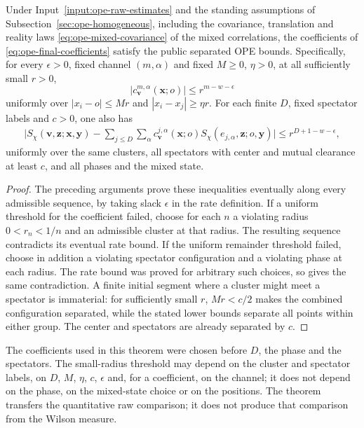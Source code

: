 \begin{theorem}\label{thm:ope-quantitative}
Under Input~\ref{input:ope-raw-estimates} and the standing assumptions of
Subsection~\ref{sec:ope-homogeneous}, including the covariance, translation and
reality laws \eqref{eq:ope-mixed-covariance} of the mixed correlations,
the coefficients of
\eqref{eq:ope-final-coefficients} satisfy the public separated OPE bounds.
Specifically, for every $\epsilon>0$, fixed channel $(m,\alpha)$ and
fixed $M\geq0$, $\eta>0$, at all sufficiently small $r>0$,
\[
 |c_{\boldsymbol v}^{m,\alpha}(\boldsymbol x;o)|
                      \leq r^{m-w-\epsilon}
\]
uniformly over $|x_i-o|\leq Mr$ and $|x_i-x_j|\geq\eta r$.
For each finite $D$, fixed spectator labels and $c>0$, one also has
\begin{align*}
 \bigg|S_\chi(\boldsymbol v,\boldsymbol z;\boldsymbol x,\boldsymbol y)
  -\sum_{j\leq D}\sum_\alpha
   c_{\boldsymbol v}^{j,\alpha}(\boldsymbol x;o)
   S_\chi(e_{j,\alpha},\boldsymbol z;o,\boldsymbol y)\bigg|
               \leq r^{D+1-w-\epsilon},
\end{align*}
uniformly over the same clusters, all spectators with center and mutual
clearance at least $c$, and all phases and the mixed state.
\end{theorem}
\begin{proof}
The preceding arguments prove these inequalities eventually along every
admissible sequence, by taking slack $\epsilon$ in the rate definition.
If a uniform threshold for the coefficient failed, choose for each $n$
a violating radius $0<r_n<1/n$ and an admissible cluster at that radius.
The resulting sequence contradicts its eventual rate bound. If the
uniform remainder threshold failed, choose in addition a violating
spectator configuration and a violating phase at each radius. The rate
bound was proved for arbitrary such choices, so gives the same
contradiction. A finite initial segment where a cluster might meet a
spectator is immaterial: for sufficiently small $r$, $Mr<c/2$ makes
the combined configuration separated, while the stated lower bounds
separate all points within either group. The center and spectators are
already separated by $c$.
\end{proof}
The coefficients used in this theorem were chosen before $D$, the phase
and the spectators. The small-radius threshold may depend on the cluster
and spectator labels, on $D$, $M$, $\eta$, $c$, $\epsilon$ and, for a
coefficient, on the channel; it does not depend on the phase, on the
mixed-state choice or on the positions. The theorem transfers the quantitative raw comparison;
it does not produce that comparison from the Wilson measure.
